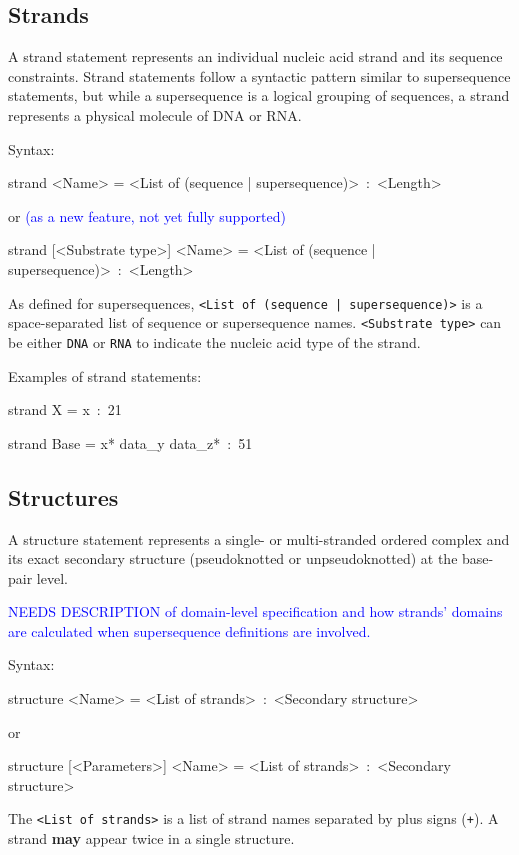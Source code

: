 \documentclass{article}
\newcommand{\add}[1]{\textcolor{blue}{#1}}
\newenvironment{code}
{\vspace{-0.1in}\par\begin{list}{}{
\setlength{\listparindent}{0pt}
\raggedright
\setlength{\itemsep}{0pt}
\setlength{\parsep}{0pt}
\normalfont\ttfamily}
 \item[]}
{\end{list}\vspace{-0.1in}}
\begin{document}
\subsection{Strands}

A strand statement represents an individual nucleic acid strand and
its sequence constraints. Strand statements follow a syntactic pattern
similar to supersequence statements, but while a supersequence is a
logical grouping of sequences, a strand represents a physical molecule
of DNA or RNA.

Syntax:
\begin{code}
strand <Name> = <List of (sequence | supersequence)>~:~<Length>
\end{code}
or \add{(as a new feature, not yet fully supported)} 
\begin{code}
strand [<Substrate type>] <Name> = <List of (sequence | supersequence)>~:~<Length>
\end{code}

As defined for supersequences, \texttt{<List of (sequence |
  supersequence)>} is a space-separated list of sequence or
supersequence names. \texttt{<Substrate type>} can be either
\texttt{DNA} or \texttt{RNA} to indicate the nucleic acid type of the
strand.

Examples of strand statements:
\begin{code}
strand X = x~:~21

strand Base = x{*} data\_y data\_z{*}~:~51
\end{code}

\subsection{Structures}

A structure statement represents a single- or multi-stranded ordered complex and its exact secondary structure (pseudoknotted or unpseudoknotted) at the base-pair level.

\add{NEEDS DESCRIPTION of domain-level specification and how strands' domains are calculated when supersequence definitions are involved.}

Syntax:
\begin{code}
structure <Name> = <List of strands>~:~<Secondary structure>
\end{code}
or
\begin{code}
structure [<Parameters>] <Name> = <List of strands>~:~<Secondary structure>
\end{code}
The \texttt{<List of strands>} is a list of strand names separated by plus signs (\texttt{+}). A strand \textbf{may} appear twice in a single structure.
\end{document}
